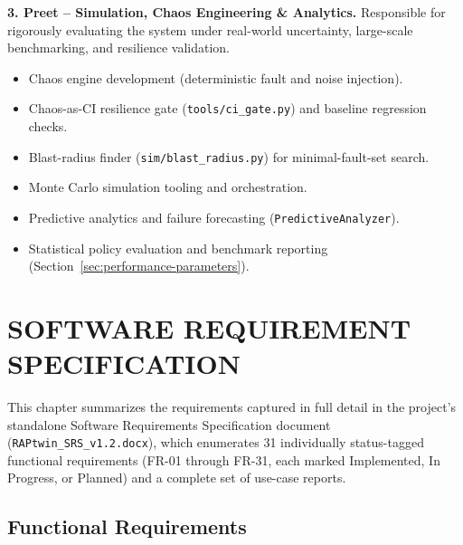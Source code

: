\documentclass[12pt,a4]{report}
\begin{document}
\textbf{3. Preet -- Simulation, Chaos Engineering \& Analytics.} Responsible for rigorously evaluating the system under real-world uncertainty, large-scale benchmarking, and resilience validation.

\begin{itemize}
    \item Chaos engine development (deterministic fault and noise injection).
    \item Chaos-as-CI resilience gate (\texttt{tools/ci\_gate.py}) and baseline regression checks.
    \item Blast-radius finder (\texttt{sim/blast\_radius.py}) for minimal-fault-set search.
    \item Monte Carlo simulation tooling and orchestration.
    \item Predictive analytics and failure forecasting (\texttt{PredictiveAnalyzer}).
    \item Statistical policy evaluation and benchmark reporting (Section~\ref{sec:performance-parameters}).
\end{itemize}

\chapter{SOFTWARE REQUIREMENT \vspace*{0.5\baselineskip} SPECIFICATION}
This chapter summarizes the requirements captured in full detail in the project's standalone Software Requirements Specification document (\texttt{RAPtwin\_SRS\_v1.2.docx}), which enumerates 31 individually status-tagged functional requirements (FR-01 through FR-31, each marked Implemented, In Progress, or Planned) and a complete set of use-case reports.

\section{Functional Requirements}
\end{document}
